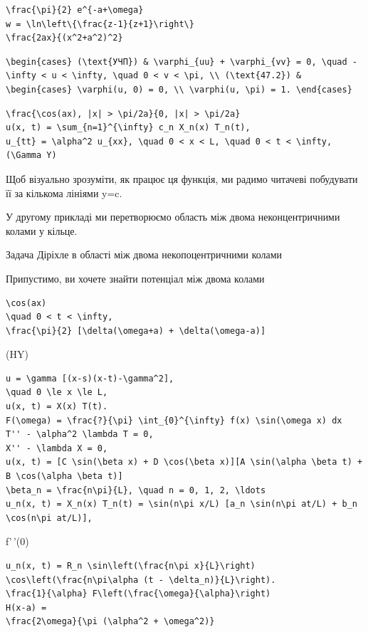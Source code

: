 \documentclass[
  ukrainian,
]{article}
\begin{document}
\begin{verbatim}
\frac{\pi}{2} e^{-a+\omega}
w = \ln\left\{\frac{z-1}{z+1}\right\}
\frac{2ax}{(x^2+a^2)^2}
\end{verbatim}

\begin{verbatim}
\begin{cases} (\text{УЧП}) & \varphi_{uu} + \varphi_{vv} = 0, \quad -\infty < u < \infty, \quad 0 < v < \pi, \\ (\text{47.2}) & \begin{cases} \varphi(u, 0) = 0, \\ \varphi(u, \pi) = 1. \end{cases}
\end{verbatim}

\begin{verbatim}
\frac{\cos(ax), |x| > \pi/2a}{0, |x| > \pi/2a}
u(x, t) = \sum_{n=1}^{\infty} c_n X_n(x) T_n(t),
u_{tt} = \alpha^2 u_{xx}, \quad 0 < x < L, \quad 0 < t < \infty,
(\Gamma Y)
\end{verbatim}

Щоб візуально зрозуміти, як працює ця функція, ми радимо читачеві
побудувати її за кількома лініями y=c.

У другому прикладі ми перетворюємо область між двома неконцентричними
колами у кільце.

Задача Діріхле в області між двома некопоцентричними колами

Припустимо, ви хочете знайти потенціал між двома колами

\begin{verbatim}
\cos(ax)
\quad 0 < t < \infty,
\frac{\pi}{2} [\delta(\omega+a) + \delta(\omega-a)]
\end{verbatim}

(HY)

\begin{verbatim}
u = \gamma [(x-s)(x-t)-\gamma^2],
\quad 0 \le x \le L,
u(x, t) = X(x) T(t).
F(\omega) = \frac{?}{\pi} \int_{0}^{\infty} f(x) \sin(\omega x) dx
T'' - \alpha^2 \lambda T = 0,
X'' - \lambda X = 0,
u(x, t) = [C \sin(\beta x) + D \cos(\beta x)][A \sin(\alpha \beta t) + B \cos(\alpha \beta t)]
\beta_n = \frac{n\pi}{L}, \quad n = 0, 1, 2, \ldots
u_n(x, t) = X_n(x) T_n(t) = \sin(n\pi x/L) [a_n \sin(n\pi at/L) + b_n \cos(n\pi at/L)],
\end{verbatim}

f'\,'(0)

\begin{verbatim}
u_n(x, t) = R_n \sin\left(\frac{n\pi x}{L}\right) \cos\left(\frac{n\pi\alpha (t - \delta_n)}{L}\right).
\frac{1}{\alpha} F\left(\frac{\omega}{\alpha}\right)
H(x-a) =
\frac{2\omega}{\pi (\alpha^2 + \omega^2)}
\end{verbatim}
\end{document}
